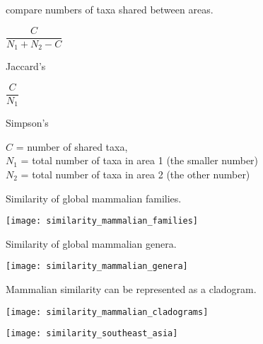 \documentclass[t]{beamer}
\begin{document}
\begin{frame}[t]{ compare numbers of taxa shared between areas.}


	\begin{multicols}{2}
	
	\begin{center}
	{\LARGE
		$\dfrac{C}{N_1 + N_2 - C}$
	}
	
	\vspace*{\baselineskip}
	
	Jaccard's
	\end{center}
	
	\columnbreak
	
	\begin{center}
	{\LARGE
		$\dfrac{C}{N_1}$
	}
	
	\vspace*{\baselineskip}

	Simpson's
	\end{center}
	\end{multicols}
	
	\hangpara $C$ = number of shared taxa, \\
	$N_1$ = total number of taxa in area 1 (the smaller number)\\
	$N_2$ = total number of taxa in area 2 (the other number)

\end{frame}
%
\begin{frame}[t]{Similarity of global mammalian families.}

	\texttt{[image: similarity\_mammalian\_families]}
	
\end{frame}
%
\begin{frame}[t]{Similarity of global mammalian genera.}

	\texttt{[image: similarity\_mammalian\_genera]}
	
\end{frame}
%
\begin{frame}[t]{Mammalian similarity can be represented as a cladogram.}

	\texttt{[image: similarity\_mammalian\_cladograms]}
	
\end{frame}
%
\begin{frame}[t]

	\texttt{[image: similarity\_southeast\_asia]}
	
\end{frame}
\end{document}
